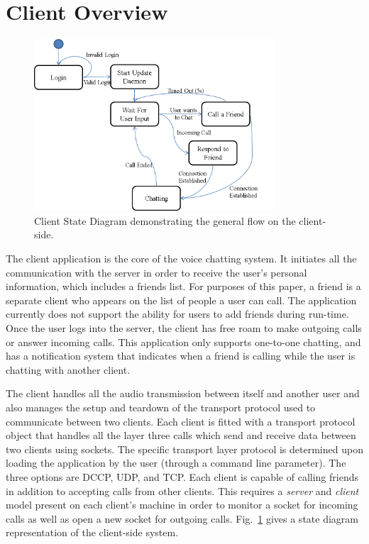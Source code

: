 
\section{Client Overview}
\label{sec:client_des}

\begin{figure}[!t]
   \centering
      \includegraphics[width=0.8\textwidth]{pics/Client_StateDiagram}
   \caption{Client State Diagram demonstrating the general flow on the client-side.}
\label{fig:client_state_diag}
\end{figure}

The client application is the core of the voice chatting system.  It initiates all
the communication with the server in order to receive the user's personal 
information, which includes a friends list. For purposes of this paper, a friend
is a separate client who appears on the list of people a user can call. The application currently
does not support the ability for users to add friends during run-time.  Once the 
user logs into the server,
the client has free roam to make outgoing calls or answer incoming calls.  This
application only supports one-to-one chatting, and has a notification system that 
indicates when a friend is calling while the user is chatting with another client.  

The client handles all the audio transmission between itself and another user
and also manages the setup and teardown of the transport protocol used to
communicate between two clients.  Each client is fitted with a transport protocol
object that handles all the layer three calls which send and receive data between
two clients using sockets.  The specific transport layer protocol is determined
upon loading the application by the user (through a command line parameter). The
three options are DCCP, UDP, and TCP. Each client is capable of calling friends in addition to accepting calls from
other clients.  This requires a \textit{server} and \textit{client} model present
on each client's machine in order to monitor a socket for incoming calls as well
as open a new socket for outgoing calls.  Fig.~\ref{fig:client_state_diag} gives 
a state diagram representation of the client-side system.



